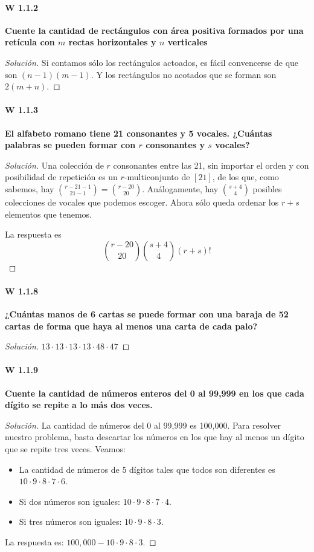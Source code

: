\documentclass[spanish]{book}
\theoremstyle{definition}
\begin{document}
\paragraph{W 1.1.2}\textbf{Cuente la cantidad de rectángulos con área positiva formados por una retícula con $m$ rectas horizontales y $n$ verticales}
\begin{proof}[Solución]
	Si contamos sólo los rectángulos actoados, es fácil convencerse de que son $(n-1)(m-1)$. Y los rectángulos no acotados que se forman son $2(m+n)$.
\end{proof}

\paragraph{W 1.1.3}\textbf{El alfabeto romano tiene 21 consonantes y 5 vocales. ¿Cuántas palabras se pueden formar con $r$ consonantes y $s$ vocales?}
\begin{proof}[Solución]
	Una colección de $r$ consonantes entre las 21, sin importar el orden y con posibilidad de repetición es un $r$-multiconjunto de $[21]$, de los que, como sabemos, hay ${r-21-1\choose21-1}={r-20\choose20}$. Análogamente, hay ${s+4\choose4}$ posibles colecciones de vocales que podemos escoger. Ahora sólo queda ordenar los $r+s$ elementos que tenemos.
	
	La respuesta es
	\[{r-20\choose20}{s+4\choose4}(r+s)!\]
\end{proof}

\paragraph{W 1.1.8}\textbf{¿Cuántas manos de 6 cartas se puede formar con una baraja de 52 cartas de forma que haya al menos una carta de cada palo?}
\begin{proof}[Solución]
	$13\cdot13\cdot13\cdot13\cdot48\cdot47$
\end{proof}

\paragraph{W 1.1.9}\textbf{Cuente la cantidad de números enteros del 0 al 99,999 en los que cada dígito se repite a lo más dos veces.}
\begin{proof}[Solución]
	La cantidad de números del 0 al 99,999 es 100,000. Para resolver nuestro problema, basta descartar los números en los que hay al menos un dígito que se repite tres veces. Veamos:
	
	\begin{itemize}
		\item 	La cantidad de números de 5 dígitos tales que todos son diferentes es $10\cdot9\cdot8\cdot7\cdot6$.
		\item Si dos números son iguales: $10\cdot9\cdot8\cdot7\cdot4$.
		\item Si tres números son iguales: $10\cdot9\cdot8\cdot3$.
	\end{itemize}
	La respuesta es: $100,000-10\cdot9\cdot8\cdot3$.
\end{proof}
\end{document}
